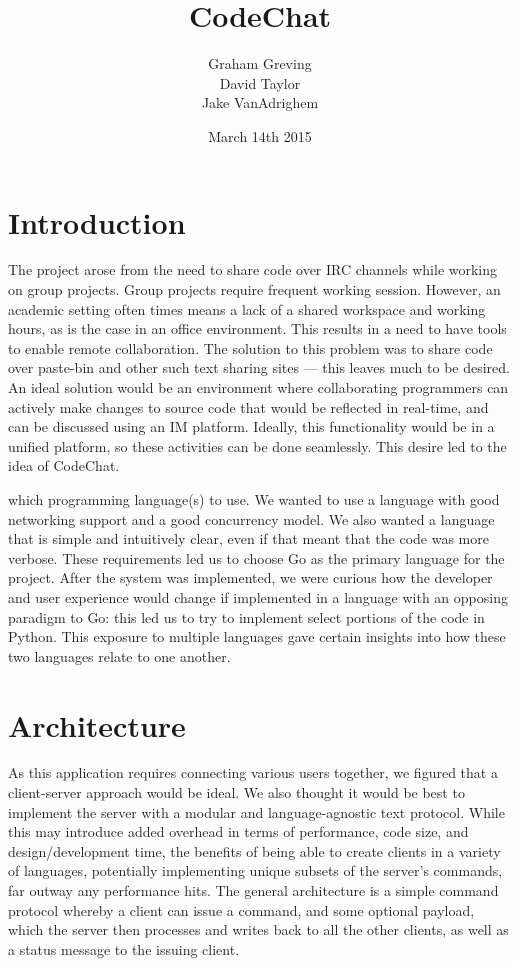 \documentclass[10pt, letterpaper]{article}
\title{CodeChat}
\author{Graham Greving \\ David Taylor \\ Jake VanAdrighem}
\date{March 14th 2015}
\begin{document}
\maketitle

\section*{Introduction}

The project arose from the need to share code over IRC channels while working 
on group projects. Group projects require frequent working session. However, 
an academic setting often times means a lack of a shared workspace and 
working hours, as is the case in an office environment. This results in a 
need to have tools to enable remote collaboration. The solution to this 
problem was to share code over paste-bin and other such text sharing sites 
--- this leaves much to be desired. An ideal solution would be an environment 
where collaborating programmers can actively make changes to source code that 
would be reflected in real-time, and can be discussed using an IM platform. 
Ideally, this functionality would be in a unified platform, so these 
activities can be done seamlessly. This desire led to the idea of CodeChat.

which programming language(s) to use. We wanted to use a language with good 
networking support and a good concurrency model. We also wanted a language 
that is simple and intuitively clear, even if that meant that the code was 
more verbose. These requirements led us to choose Go as the primary language 
for the project. After the system was implemented, we were curious how the 
developer and user experience would change if implemented in a language with 
an opposing paradigm to Go: this led us to try to implement select portions 
of the code in Python. This exposure to multiple languages gave certain 
insights into how these two languages relate to one another.

\section*{Architecture}

As this application requires connecting various users together, we figured 
that a client-server approach would be ideal. We also thought it would be 
best to implement the server with a modular and language-agnostic text 
protocol. While this may introduce added overhead in terms of performance, 
code size, and design/development time, the benefits of being able to create 
clients in a variety of languages, potentially implementing unique 
subsets of the server's commands, far outway any performance hits. The 
general architecture is a simple command protocol whereby a client can 
issue a command, and some optional payload, which the server then processes  
and writes back to all the other clients, as well as a status message to the 
issuing client.
\end{document}
